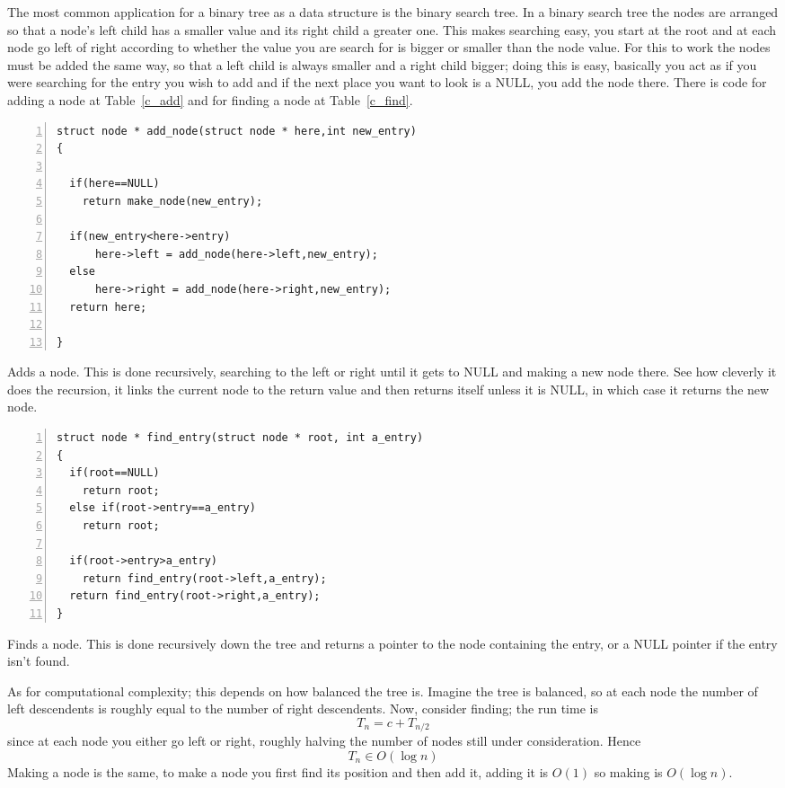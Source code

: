 \documentclass[11pt,a4paper]{scrartcl}
\begin{document}
The most common application for a binary tree as a data structure is
the binary search tree. In a binary search tree the nodes are arranged
so that a node's left child has a smaller value and its right child a
greater one. This makes searching easy, you start at the root and at
each node go left of right according to whether the value you are
search for is bigger or smaller than the node value. For this to work
the nodes must be added the same way, so that a left child is always
smaller and a right child bigger; doing this is easy, basically you
act as if you were searching for the entry you wish to add and if the
next place you want to look is a NULL, you add the node there. There
is code for adding a node at Table~\ref{c_add} and for finding a node
at Table~\ref{c_find}.


\begin{table}
\begin{lstlisting}[numbers=left]
struct node * add_node(struct node * here,int new_entry)
{

  if(here==NULL)
    return make_node(new_entry);

  if(new_entry<here->entry)
      here->left = add_node(here->left,new_entry);
  else
      here->right = add_node(here->right,new_entry);
  return here;

}
\end{lstlisting}
\caption{Adds a node. This is done recursively, searching to the left
  or right until it gets to NULL and making a new node there. See how
  cleverly it does the recursion, it links the current node to the
  return value and then returns itself unless it is NULL, in which
  case it returns the new node.\label{c_add}}
\end{table}


\begin{table}
\begin{lstlisting}[numbers=left]
struct node * find_entry(struct node * root, int a_entry)
{
  if(root==NULL)
    return root;
  else if(root->entry==a_entry)
    return root;

  if(root->entry>a_entry)
    return find_entry(root->left,a_entry);
  return find_entry(root->right,a_entry);
}
\end{lstlisting}
\caption{Finds a node. This is done recursively down the tree and returns a pointer to the node containing the entry, or a NULL pointer if the entry isn't found.\label{c_find}}
\end{table}

As for computational complexity; this depends on how balanced the tree
is. Imagine the tree is balanced, so at each node the number of left
descendents is roughly equal to the number of right descendents. Now,
consider finding; the run time is
\begin{equation}
T_n=c+T_{n/2}
\end{equation}
since at each node you either go left or right, roughly halving the
number of nodes still under consideration. Hence
\begin{equation}
T_n\in O(\log n)
\end{equation}
Making a node is the same, to make a node you first find its position
and then add it, adding it is $O(1)$ so making is $O(\log{n})$.
\end{document}
